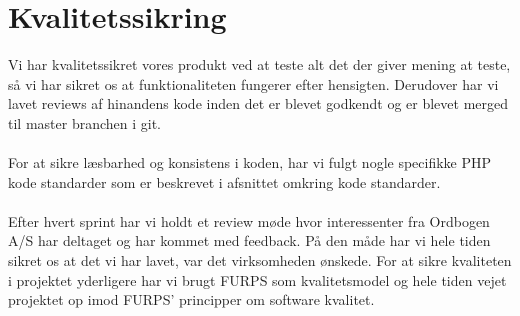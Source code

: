 \section{Kvalitetssikring}
Vi har kvalitetssikret vores produkt ved at teste alt det der giver mening at teste,
så vi har sikret os at funktionaliteten fungerer efter hensigten. Derudover har vi lavet reviews af hinandens kode inden
det er blevet godkendt og er blevet merged til master branchen i git.
\\\\
For at sikre læsbarhed og konsistens i koden, har vi fulgt nogle specifikke PHP kode standarder som er beskrevet i afsnittet omkring kode standarder.
\\\\
Efter hvert sprint har vi holdt et review møde hvor interessenter fra Ordbogen A/S har deltaget og har kommet med feedback.
På den måde har vi hele tiden sikret os at det vi har lavet, var det virksomheden ønskede.
For at sikre kvaliteten i projektet yderligere har vi brugt FURPS som kvalitetsmodel og hele tiden
vejet projektet op imod FURPS' principper om software kvalitet.
